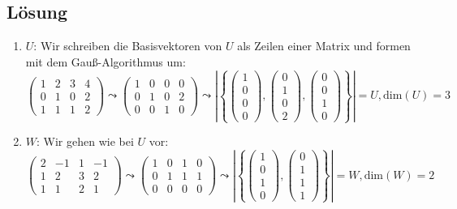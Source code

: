 \subsection{Lösung}
\begin{enumerate}
	\item \( U \): Wir schreiben die Basisvektoren von \( U \) als Zeilen einer Matrix und formen mit dem Gauß-Algorithmus um:
	\begin{equation*}
	 	\begin{pmatrix}
	 		1 & 2 & 3 & 4 \\
	 		0 & 1 & 0 & 2 \\
	 		1 & 1 & 1 & 2
	 	\end{pmatrix} \leadsto \begin{pmatrix}
	 		1 & 0 & 0 & 0 \\
	 		0 & 1 & 0 & 2 \\
	 		0 & 0 & 1 & 0
	 	\end{pmatrix} \leadsto \left | \left \{ \begin{pmatrix}
	 	1 \\ 0 \\ 0 \\ 0
	 \end{pmatrix}, \begin{pmatrix}
	 	0 \\ 1 \\ 0 \\ 2
	 \end{pmatrix}, \begin{pmatrix}
	 	0 \\ 0 \\ 1 \\ 0
	 \end{pmatrix} \right \} \right | = U, \text{dim}(U) = 3
	 \end{equation*}

	 \item \( W \): Wir gehen wie bei \( U \) vor:
	 \begin{equation*}
	 	\begin{pmatrix}
	 		2 & -1 & 1 & -1 \\
	 		1 & 2 & 3 & 2 \\
	 		1 & 1 & 2 & 1
	 	\end{pmatrix} \leadsto \begin{pmatrix}
	 		1 & 0 & 1 & 0 \\
	 		0 & 1 & 1 & 1 \\
	 		0 & 0 & 0 & 0 
	 	\end{pmatrix} \leadsto \left | \left \{ \begin{pmatrix}
	 	1 \\ 0 \\ 1 \\ 0
	 \end{pmatrix}, \begin{pmatrix}
	 	0 \\ 1 \\ 1 \\ 1
	 \end{pmatrix} \right \} \right | = W, \text{dim}(W) = 2
	 \end{equation*}
	 

\end{enumerate}
